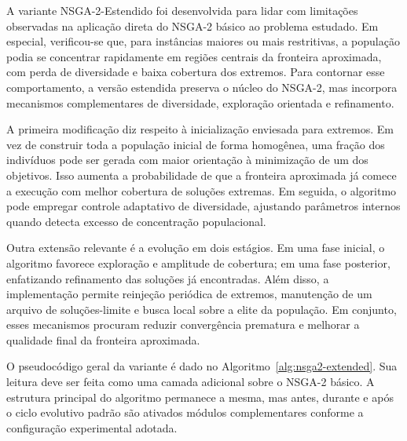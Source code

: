 A variante NSGA-2-Estendido foi desenvolvida para lidar com limitações observadas na aplicação direta do NSGA-2 básico ao problema estudado. Em especial, verificou-se que, para instâncias maiores ou mais restritivas, a população podia se concentrar rapidamente em regiões centrais da fronteira aproximada, com perda de diversidade e baixa cobertura dos extremos. Para contornar esse comportamento, a versão estendida preserva o núcleo do NSGA-2, mas incorpora mecanismos complementares de diversidade, exploração orientada e refinamento.

A primeira modificação diz respeito à inicialização enviesada para extremos. Em vez de construir toda a população inicial de forma homogênea, uma fração dos indivíduos pode ser gerada com maior orientação à minimização de um dos objetivos. Isso aumenta a probabilidade de que a fronteira aproximada já comece a execução com melhor cobertura de soluções extremas. Em seguida, o algoritmo pode empregar controle adaptativo de diversidade, ajustando parâmetros internos quando detecta excesso de concentração populacional.

Outra extensão relevante é a evolução em dois estágios. Em uma fase inicial, o algoritmo favorece exploração e amplitude de cobertura; em uma fase posterior, enfatizando refinamento das soluções já encontradas. Além disso, a implementação permite reinjeção periódica de extremos, manutenção de um arquivo de soluções-limite e busca local sobre a elite da população. Em conjunto, esses mecanismos procuram reduzir convergência prematura e melhorar a qualidade final da fronteira aproximada.

O pseudocódigo geral da variante é dado no Algoritmo~\ref{alg:nsga2-extended}. Sua leitura deve ser feita como uma camada adicional sobre o NSGA-2 básico. A estrutura principal do algoritmo permanece a mesma, mas antes, durante e após o ciclo evolutivo padrão são ativados módulos complementares conforme a configuração experimental adotada.

\newpage

